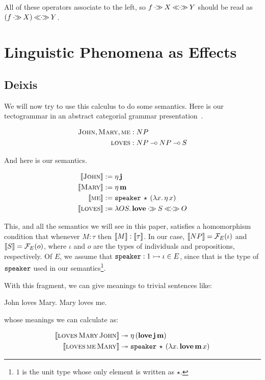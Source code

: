 \documentclass{llncs}
\begin{document}
All of these operators associate to the left, so $f \mathbin{\cdot\!\!\gg} X \mathbin{\ll\!\!\cdot\!\!\gg} Y$ should
be read as $(f \mathbin{\cdot\!\!\gg} X) \mathbin{\ll\!\!\cdot\!\!\gg} Y$.


\section{Linguistic Phenomena as Effects}
\label{sec:phenomena}

\subsection{Deixis}
\label{ssec:deixis}

We will now try to use this calculus to do some semantics. Here is our
tectogrammar in an abstract categorial grammar
presentation~\cite{de2001towards}.

\begin{align*}
  \textsc{John}, \textsc{Mary}, \textsc{me} &: NP \\
  \textsc{loves} &: NP \mathbin{{-}\mkern-3.5mu{\circ}} NP \mathbin{{-}\mkern-3.5mu{\circ}} S
\end{align*}

And here is our semantics.

\begin{align*}
  \llbracket \textsc{John} \rrbracket &:= \eta\,\textbf{j} \\
  \llbracket \textsc{Mary} \rrbracket &:= \eta\,\textbf{m} \\
  \llbracket \textsc{me} \rrbracket &:= \mathtt{speaker}\,\star\,(\lambda x.\, \eta\,x) \\
  \llbracket \textsc{loves} \rrbracket &:= \lambda O S.\, {\textbf{love}} \mathbin{\cdot\!\!\gg} S \mathbin{\ll\!\!\cdot\!\!\gg} O
\end{align*}

This, and all the semantics we will see in this paper, satisfies a
homomorphism condition that whenever $M : \tau$ then $\llbracket M \rrbracket :
\llbracket \tau \rrbracket$. In our case, $\llbracket NP \rrbracket = \mathcal{F}_E(\iota)$ and $\llbracket S \rrbracket =
\mathcal{F}_E(o)$, where $\iota$ and $o$ are the types of individuals and
propositions, respectively. Of $E$, we assume that
$\mathtt{speaker} : 1 \rightarrowtail \iota \in E$, since that is the type of
$\mathtt{speaker}$ used in our semantics\footnote{$1$ is the unit type whose
  only element is written as $\star$.}.

With this fragment, we can give meanings to trivial sentences like:

\begin{exe}
  \ex John loves Mary. \label{ex:trivial}
  \ex Mary loves me. \label{ex:deixis}
\end{exe}

whose meanings we can calculate as:

\begin{align}
  \llbracket \textsc{loves}\,\textsc{Mary}\,\textsc{John} \rrbracket & \twoheadrightarrow 
  \eta\,(\textbf{love}\,\textbf{j}\,\textbf{m}) \\
  \llbracket \textsc{loves}\,\textsc{me}\,\textsc{Mary} \rrbracket & \twoheadrightarrow
  \mathtt{speaker}\,\star\,(\lambda x.\, \textbf{love}\,\textbf{m}\,x)
\end{align}
\end{document}
